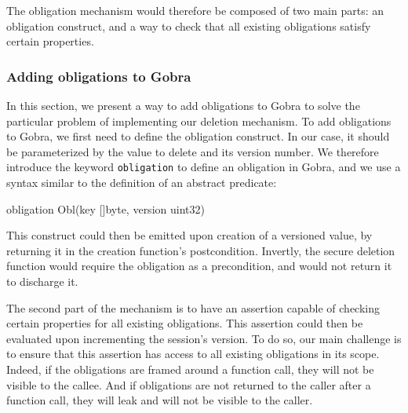 The obligation mechanism would therefore be composed of two main parts: an obligation construct, and a way to check that all existing obligations satisfy certain properties.

\subsubsection{Adding obligations to Gobra}
\label{sec:adding-obligations-to-gobra}

In this section, we present a way to add obligations to Gobra to solve the particular problem of implementing our deletion mechanism.
To add obligations to Gobra, we first need to define the obligation construct.
In our case, it should be parameterized by the value to delete and its version number.
We therefore introduce the keyword \texttt{obligation} to define an obligation in Gobra, and we use a syntax similar to the definition of an abstract predicate:
\begin{gobra}
obligation Obl(key []byte, version uint32)
\end{gobra}
This construct could then be emitted upon creation of a versioned value, by returning it in the creation function's postcondition.
Invertly, the secure deletion function would require the obligation as a precondition, and would not return it to discharge it.

The second part of the mechanism is to have an assertion capable of checking certain properties for all existing obligations. This assertion could then be evaluated upon incrementing the session's version.
To do so, our main challenge is to ensure that this assertion has access to all existing obligations in its scope.
Indeed, if the obligations are framed around a function call, they will not be visible to the callee.
And if obligations are not returned to the caller after a function call, they will leak and will not be visible to the caller.

